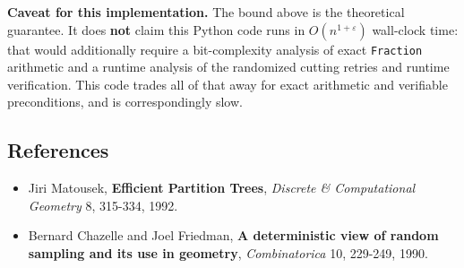 \documentclass[
  11pt,
]{article}
\providecommand{\tightlist}{%
  \setlength{\itemsep}{0pt}\setlength{\parskip}{0pt}}
\begin{document}
\textbf{Caveat for this implementation.} The bound above is the
theoretical guarantee. It does \textbf{not} claim this Python code runs
in \(O(n^{1+\varepsilon})\) wall-clock time: that would additionally
require a bit-complexity analysis of exact \texttt{Fraction} arithmetic
and a runtime analysis of the randomized cutting retries and runtime
verification. This code trades all of that away for exact arithmetic and
verifiable preconditions, and is correspondingly slow.

\hypertarget{references}{%
\subsection{References}\label{references}}

\begin{itemize}
\tightlist
\item
  Jiri Matousek, \textbf{Efficient Partition Trees}, \emph{Discrete \&
  Computational Geometry} 8, 315-334, 1992.
\item
  Bernard Chazelle and Joel Friedman, \textbf{A deterministic view of
  random sampling and its use in geometry}, \emph{Combinatorica} 10,
  229-249, 1990.
\end{itemize}
\end{document}

